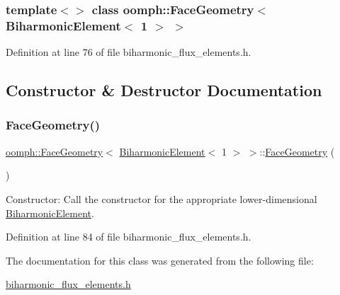 \subsubsection*{template$<$$>$\newline
class oomph\+::\+Face\+Geometry$<$ Biharmonic\+Element$<$ 1 $>$ $>$}



Definition at line 76 of file biharmonic\+\_\+flux\+\_\+elements.\+h.



\subsection{Constructor \& Destructor Documentation}
\mbox{\label{classoomph_1_1FaceGeometry_3_01BiharmonicElement_3_011_01_4_01_4_ae7dff81664b957d531607ba4a7c2a729}} 
\subsubsection{\texorpdfstring{Face\+Geometry()}{FaceGeometry()}}
{\footnotesize\ttfamily \hyperlink{classoomph_1_1FaceGeometry}{oomph\+::\+Face\+Geometry}$<$ \hyperlink{classoomph_1_1BiharmonicElement}{Biharmonic\+Element}$<$ 1 $>$ $>$\+::\hyperlink{classoomph_1_1FaceGeometry}{Face\+Geometry} (\begin{DoxyParamCaption}{ }\end{DoxyParamCaption})\hspace{0.3cm}{\ttfamily [inline]}}



Constructor\+: Call the constructor for the appropriate lower-\/dimensional \hyperlink{classoomph_1_1BiharmonicElement}{Biharmonic\+Element}. 



Definition at line 84 of file biharmonic\+\_\+flux\+\_\+elements.\+h.



The documentation for this class was generated from the following file\+:\begin{DoxyCompactItemize}
\item 
\hyperlink{biharmonic__flux__elements_8h}{biharmonic\+\_\+flux\+\_\+elements.\+h}\end{DoxyCompactItemize}
